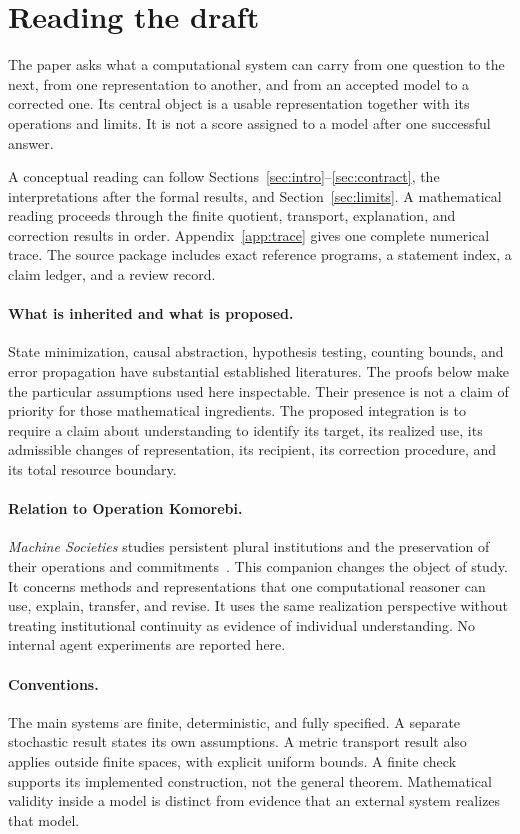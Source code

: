 \documentclass[11pt,letterpaper]{article}
\theoremstyle{plain}
\theoremstyle{definition}
\begin{document}
\section*{Reading the draft}
The paper asks what a computational system can carry from one question to the next, from one representation to another, and from an accepted model to a corrected one. Its central object is a usable representation together with its operations and limits. It is not a score assigned to a model after one successful answer.

A conceptual reading can follow Sections~\ref{sec:intro}--\ref{sec:contract}, the interpretations after the formal results, and Section~\ref{sec:limits}. A mathematical reading proceeds through the finite quotient, transport, explanation, and correction results in order. Appendix~\ref{app:trace} gives one complete numerical trace. The source package includes exact reference programs, a statement index, a claim ledger, and a review record.

\paragraph{What is inherited and what is proposed.}
State minimization, causal abstraction, hypothesis testing, counting bounds, and error propagation have substantial established literatures. The proofs below make the particular assumptions used here inspectable. Their presence is not a claim of priority for those mathematical ingredients. The proposed integration is to require a claim about understanding to identify its target, its realized use, its admissible changes of representation, its recipient, its correction procedure, and its total resource boundary.

\paragraph{Relation to Operation Komorebi.}
\emph{Machine Societies} studies persistent plural institutions and the preservation of their operations and commitments~\cite{societies}. This companion changes the object of study. It concerns methods and representations that one computational reasoner can use, explain, transfer, and revise. It uses the same realization perspective without treating institutional continuity as evidence of individual understanding. No internal agent experiments are reported here.

\paragraph{Conventions.}
The main systems are finite, deterministic, and fully specified. A separate stochastic result states its own assumptions. A metric transport result also applies outside finite spaces, with explicit uniform bounds. A finite check supports its implemented construction, not the general theorem. Mathematical validity inside a model is distinct from evidence that an external system realizes that model.
\end{document}
